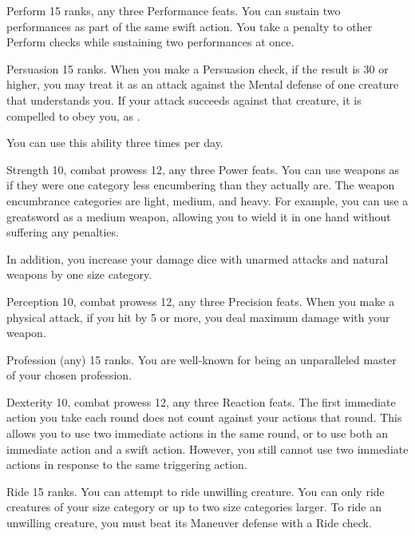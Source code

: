 \featpres Perform 15 ranks, any three Performance feats.
\featben You can sustain two performances as part of the same swift action.
You take a  penalty to other Perform checks while sustaining two performances at once.

\featpre Persuasion 15 ranks.
\featben When you make a Persuasion check, if the result is 30 or higher, you may treat it as an attack against the Mental defense of one creature that understands you.
If your attack succeeds against that creature, it is compelled to obey you, as .

You can use this ability three times per day.

\featpres Strength 10, combat prowess 12, any three Power feats.
\featben You can use weapons as if they were one category less encumbering than they actually are.
The weapon encumbrance categories are light, medium, and heavy.
For example, you can use a greatsword as a medium weapon, allowing you to wield it in one hand without suffering any penalties.

In addition, you increase your damage dice with unarmed attacks and natural weapons by one size category.

\featpres Perception 10, combat prowess 12, any three Precision feats.
\featben When you make a physical attack, if you hit by 5 or more, you deal maximum damage with your weapon.

\featpre Profession (any) 15 ranks.
\featben You are well-known for being an unparalleled master of your chosen profession.

\featpres Dexterity 10, combat prowess 12, any three Reaction feats.
\featben The first immediate action you take each round does not count against your actions that round.
This allows you to use two immediate actions in the same round, or to use both an immediate action and a swift action.
However, you still cannot use two immediate actions in response to the same triggering action.

\featpre Ride 15 ranks.
\featben You can attempt to ride unwilling creature.
You can only ride creatures of your size category or up to two size categories larger.
To ride an unwilling creature, you must beat its Maneuver defense with a Ride check.

